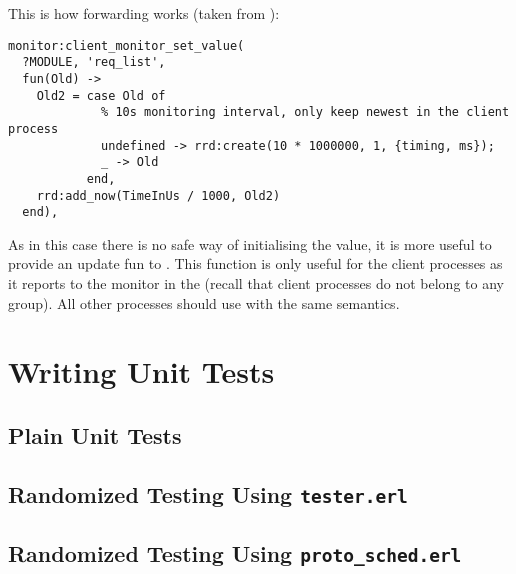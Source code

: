 This is how forwarding works (taken from ):

\begin{lstlisting}
monitor:client_monitor_set_value(
  ?MODULE, 'req_list',
  fun(Old) ->
    Old2 = case Old of
             % 10s monitoring interval, only keep newest in the client process
             undefined -> rrd:create(10 * 1000000, 1, {timing, ms});
             _ -> Old
           end,
    rrd:add_now(TimeInUs / 1000, Old2)
  end),
\end{lstlisting}

As in this case there is no safe way of initialising the value, it is more
useful to provide an update fun to
. This function is only useful
for the client processes as it reports to the monitor in the
 (recall that client processes do not belong to any group).
All other processes should use  with
the same semantics.

\section{Writing Unit Tests}

\subsection{Plain Unit Tests}

\subsection{Randomized Testing Using \texttt{tester.erl}}

\subsection{Randomized Testing Using \texttt{proto_sched.erl}}